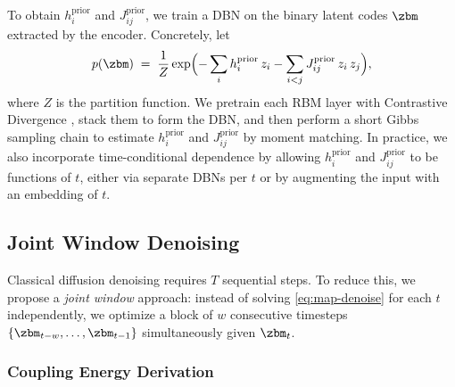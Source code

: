 \documentclass[11pt,letterpaper]{article}
\begin{document}
To obtain $h_i^{\text{prior}}$ and $J_{ij}^{\text{prior}}$, we train a DBN on the binary latent codes $\zbm$ extracted by the encoder. Concretely, let
\[
p(\zbm) \;=\; \frac{1}{Z}\exp\Bigl(-\sum_{i} h_i^{\text{prior}}\,z_i - \sum_{i<j} J_{ij}^{\text{prior}}\,z_i\,z_j\Bigr),
\]
where $Z$ is the partition function. We pretrain each RBM layer with Contrastive Divergence \cite{hinton2002training}, stack them to form the DBN, and then perform a short Gibbs sampling chain to estimate $h_i^{\text{prior}}$ and $J_{ij}^{\text{prior}}$ by moment matching. In practice, we also incorporate time-conditional dependence by allowing $h_i^{\text{prior}}$ and $J_{ij}^{\text{prior}}$ to be functions of $t$, either via separate DBNs per $t$ or by augmenting the input with an embedding of $t$.

\subsection{Joint Window Denoising}
\label{subsec:joint-window}

Classical diffusion denoising requires $T$ sequential steps. To reduce this, we propose a \emph{joint window} approach: instead of solving \eqref{eq:map-denoise} for each $t$ independently, we optimize a block of $w$ consecutive timesteps $\{\zbm_{t-w},\ldots,\zbm_{t-1}\}$ simultaneously given $\zbm_t$.

\subsubsection{Coupling Energy Derivation}
\label{subsubsec:coupling-derivation}
\end{document}
